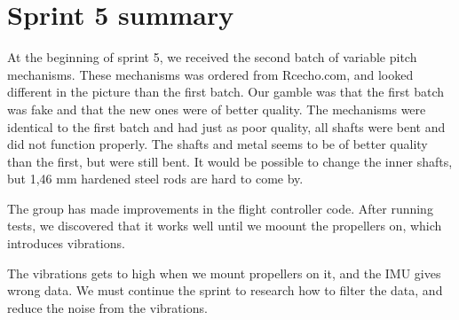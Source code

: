 \section{Sprint 5 summary}

At the beginning of sprint 5, we received the second batch of variable pitch mechanisms. These mechanisms was ordered from Rcecho.com, and looked different in the picture than the first batch. Our gamble was that the first batch was fake and that the new ones were of better quality.
The mechanisms were identical to the first batch and had just as poor quality, all shafts were bent and did not function properly. The shafts and metal seems to be of better quality than the first, but were still bent. It would be possible to change the inner shafts, but 1,46 mm hardened steel rods are hard to come by.

 The group has made improvements in the flight controller code. After running tests, we discovered that it works well until we moount the propellers on, which introduces vibrations. 
 
 
 The vibrations gets to high when we mount propellers on it, and the IMU gives wrong data. We must continue the sprint to research how to filter the data, and reduce the noise from the vibrations.

\begin{comment}
Sprint 5:
Scrum Ceremonies
Manually Scheduled	Mechanical Design Review 
Mechanical Improvements
Flight Testing And Control
Servo Control, Variable Pitch
Controller
Advanced Control Functionallity 
Acceptance Testing
\end{comment}